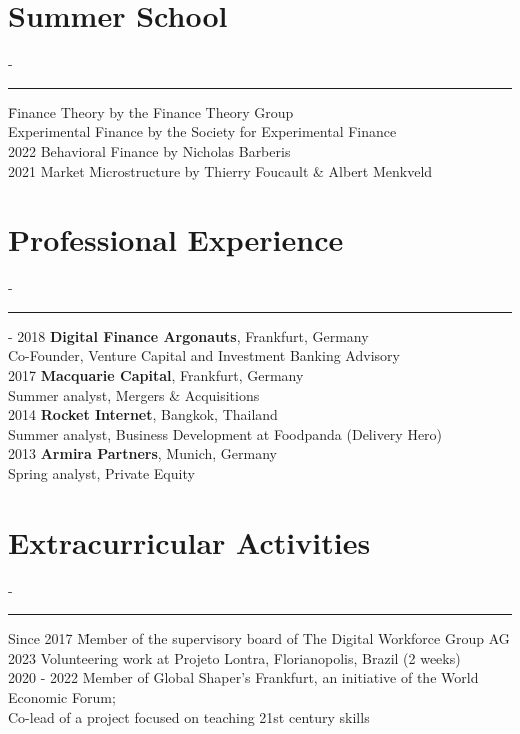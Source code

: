 \documentclass{res}
\newcommand{\sectionline}{	\vspace{-8pt}
	{\parindent-\sectionwidth \rule{\resumewidth}{0.4pt}} }
\newenvironment{nstabbing}
  {\setlength{\topsep}{-\parskip}%
   \setlength{\partopsep}{0pt}%
   \tabbing}
  {\endtabbing}
\begin{document}
\begin{resume}

\newpage
\section{Summer School}
	\sectionline
	\vspace{-3ex}
	\begin{nstabbing}
		2023 \qquad \qquad \qquad \= Finance Theory by the Finance Theory Group \\
			\> Experimental Finance by the Society for Experimental Finance \\[0.5ex]
		2022 \> Behavioral Finance by Nicholas Barberis \\[0.5ex]
		2021 \> Market Microstructure by Thierry Foucault \& Albert Menkveld
	\end{nstabbing}

\section{Professional Experience}
	\sectionline
	\vspace{-3ex}
   \begin{nstabbing}
    2015 - 2018 \qquad \quad \= \textbf{Digital Finance Argonauts}, Frankfurt, Germany \\
    	\> Co-Founder, Venture Capital and Investment Banking Advisory \\[0.5ex]
	2017 \> \textbf{Macquarie Capital}, Frankfurt, Germany\\
    	\> Summer analyst, Mergers \& Acquisitions \\[0.5ex]
	2014 \> \textbf{Rocket Internet}, Bangkok, Thailand\\
    	\> Summer analyst, Business Development at Foodpanda (Delivery Hero) \\[0.5ex]
	2013 \> \textbf{Armira Partners}, Munich, Germany\\
    	\>  Spring analyst, Private Equity
    \end{nstabbing}

\section{Extracurricular Activities}
	\sectionline
	\vspace{-3ex}
    \begin{nstabbing}
		Since 2017 \qquad \quad \= Member of the supervisory board of The Digital Workforce Group AG \\[0.5ex]
		2023 \> Volunteering work at Projeto Lontra, Florianopolis, Brazil (2 weeks)\\[0.5ex]
    	2020 - 2022 \> Member of Global Shaper's Frankfurt, an initiative of the World Economic Forum; \\
			\> Co-lead of a project focused on teaching 21st century skills
	\end{nstabbing}


\end{resume}
\end{document}

